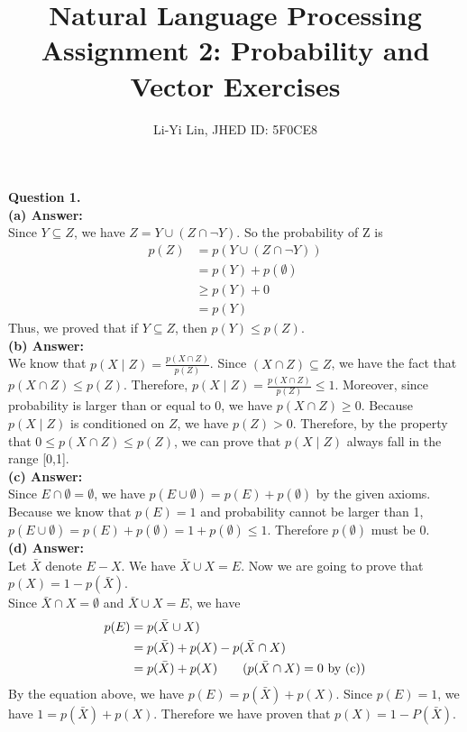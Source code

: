 \documentclass{article}
\title{Natural Language Processing\\Assignment 2: Probability and Vector Exercises}
\author{Li-Yi Lin, JHED ID: 5F0CE8}
\date{}
\begin{document}
\maketitle

\noindent
\textbf{Question 1.}\\
\textbf{(a) Answer:}\\
Since $Y \subseteq Z$, we have $Z = Y \cup (Z \cap \neg Y)$. So the probability of Z is
\begin{align*}
  p(Z)
  &= p(Y \cup (Z \cap \neg Y))
  \\ &= p(Y) + p(\emptyset)                   
  \\ &\geq p(Y) + 0         \tag{$p(\emptyset) \geq 0$}
  \\ &= p(Y)  
\end{align*}
Thus, we proved that if $Y \subseteq Z$, then $p(Y) \leq p(Z)$.
\\

\noindent
\textbf{(b) Answer:}\\
We know that $p(X \mid Z) = \frac{p(X \cap Z)}{p(Z)}$. Since $(X \cap Z) \subseteq Z$, we have the fact that $p(X \cap Z) \leq p(Z)$. Therefore, $p(X \mid Z) = \frac{p(X \cap Z)}{p(Z)} \leq 1$. Moreover, since probability is larger than or equal to 0, we have $p(X \cap Z) \geq 0$. Because $p(X \mid Z)$ is conditioned on $Z$, we have $p(Z) > 0$. Therefore, by the property that $0 \leq p(X \cap Z) \leq p(Z)$, we can prove that $p(X \mid Z)$ always fall in the range [0,1].
\\

\noindent
\textbf{(c) Answer:}\\
Since $E \cap \emptyset = \emptyset$, we have $p(E \cup \emptyset) = p(E) + p(\emptyset)$ by the given axioms. Because we know that $p(E) = 1$ and probability cannot be larger than 1, $p(E \cup \emptyset) = p(E) + p(\emptyset) = 1 + p(\emptyset) \leq 1$. Therefore $p(\emptyset)$ must be 0.
\\

\noindent
\textbf{(d) Answer:}\\
Let $\bar{X}$ denote $E - X$. We have $\bar{X} \cup X = E$. Now we are going to prove that $p(X) = 1 - p(\bar{X})$.\\
Since $\bar{X} \cap X = \emptyset$ and $\bar{X} \cup X = E$, we have
\begin{align*}
  p(E)
  &= p(\bar{X} \cup X)
  \\ &= p(\bar{X}) + p(X) - p(\bar{X} \cap X)          
  \\ &= p(\bar{X}) + p(X)       \tag{$p(\bar{X} \cap X) = 0$ by (c)}
\end{align*}
By the equation above, we have $p(E) = p(\bar{X}) + p(X)$. Since $p(E) = 1$, we have $1 = p(\bar{X}) + p(X)$. Therefore we have proven that $p(X) = 1 - P(\bar{X})$.
\\
\end{document}
